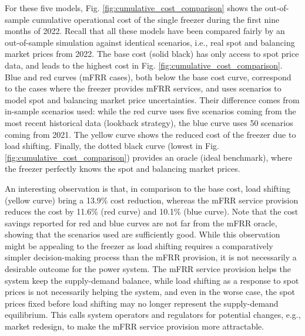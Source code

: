 For these five models, Fig. \ref{fig:cumulative_cost_comparison} shows the out-of-sample cumulative operational cost of the single freezer during the first nine months of 2022. Recall that all these models have been compared fairly by an out-of-sample simulation against identical scenarios, i.e., real spot and balancing market prices from 2022. 
The base cost (solid black) has only access to spot price data, and leads to the highest cost in Fig. \ref{fig:cumulative_cost_comparison}. 
Blue and red curves (mFRR cases), both below the base cost curve, correspond to the cases where the freezer provides mFRR services, and uses scenarios to model spot and balancing market price uncertainties. Their difference comes from in-sample scenarios used: while the red curve uses five scenarios coming from the most recent historical data (lookback strategy), the blue curve uses 50 scenarios coming from 2021. The yellow curve shows the reduced cost of the freezer due to  load shifting. Finally, the dotted black curve (lowest in Fig. \ref{fig:cumulative_cost_comparison}) provides an oracle (ideal benchmark), where the freezer perfectly knows the spot and balancing market prices. 

An interesting observation is that, in comparison to the base cost, load shifting (yellow curve) bring a 13.9\% cost reduction, whereas the mFRR service provision reduces the cost by  11.6\% (red curve) and 10.1\% (blue curve). Note that the cost savings reported for red and blue curves are not far  from the mFRR oracle, showing that the scenarios used are sufficiently good. 
While this observation might be appealing to the freezer as load shifting requires a comparatively simpler decision-making process than the mFRR provision, it is not necessarily a desirable outcome for the power system. The mFRR service provision helps the system keep the supply-demand balance, while load shifting as a response to spot prices is not necessarily helping the system, and even in the worse case, the spot prices fixed before load shifting may no longer represent the supply-demand equilibrium. This calls system operators and regulators for potential changes, e.g., market redesign, to make the mFRR service provision more attractable. 



